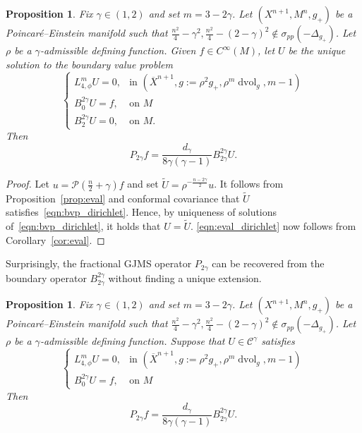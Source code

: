 \documentclass{amsart}
\newtheorem{prop}[thm]{Proposition}
\theoremstyle{definition}
\theoremstyle{remark}
\numberwithin{equation}{section}
\begin{document}
\begin{prop}
 \label{prop:eval_dirichlet}
 Fix $\gamma\in(1,2)$ and set $m=3-2\gamma$.  Let $(X^{n+1},M^n,g_+)$ be a Poincar\'e--Einstein manifold such that $\frac{n^2}{4}-\gamma^2,\frac{n^2}{4}-(2-\gamma)^2\not\in\sigma_{pp}(-\Delta_{g_+})$.  Let $\rho$ be a $\gamma$-admissible defining function.  Given $f\in C^\infty(M)$, let $U$ be the unique solution to the boundary value problem
 \begin{equation}
  \label{eqn:bvp_dirichlet}
  \begin{cases}
   L_{4,\phi}^mU = 0, & \text{in $\left({\overline{X}}^{n+1},g:=\rho^2g_+,\rho^m\operatorname{dvol}_g,m-1\right)$} \\
   B_{0}^{2\gamma}U = f, & \text{on $M$} \\
   B_{2}^{2\gamma}U = 0, & \text{on $M$}.
  \end{cases}
 \end{equation}
 Then
 \begin{equation}
 \label{eqn:eval_dirichlet}
  P_{2\gamma}f = \frac{d_\gamma}{8\gamma(\gamma-1)}B_{2\gamma}^{2\gamma}U .
 \end{equation}
\end{prop}

\begin{proof}
 Let $u={\mathcal{P}}\left(\frac{n}{2}+\gamma\right)f$ and set $\tilde U=\rho^{-\frac{n-2\gamma}{2}}u$.  It follows from Proposition~\ref{prop:eval} and conformal covariance that $\tilde U$ satisfies~\eqref{eqn:bvp_dirichlet}.  Hence, by uniqueness of solutions of~\eqref{eqn:bvp_dirichlet}, it holds that $U=\tilde U$.  \eqref{eqn:eval_dirichlet} now follows from Corollary~\ref{cor:eval}.
\end{proof}

Surprisingly, the fractional GJMS operator $P_{2\gamma}$ can be recovered from the boundary operator $B_{2\gamma}^{2\gamma}$ without finding a unique extension.

\begin{prop}
 \label{prop:eval_surprise}
 Fix $\gamma\in(1,2)$ and set $m=3-2\gamma$.  Let $(X^{n+1},M^n,g_+)$ be a Poincar\'e--Einstein manifold such that $\frac{n^2}{4}-\gamma^2,\frac{n^2}{4}-(2-\gamma)^2\not\in\sigma_{pp}(-\Delta_{g_+})$.  Let $\rho$ be a $\gamma$-admissible defining function.  Suppose that $U\in{\mathcal{C}}^\gamma$ satisfies
 \[ \begin{cases}
     L_{4,\phi}^mU = 0, & \text{in $\left({\overline{X}}^{n+1},g:=\rho^2g_+,\rho^m\operatorname{dvol}_g,m-1\right)$} \\
     B_{0}^{2\gamma}U = f, & \text{on $M$}
    \end{cases} \]
 Then
 \begin{equation}
  \label{eqn:eval_surprise}
  P_{2\gamma}f = \frac{d_\gamma}{8\gamma(\gamma-1)}B_{2\gamma}^{2\gamma}U .
 \end{equation}
\end{prop}
\end{document}
